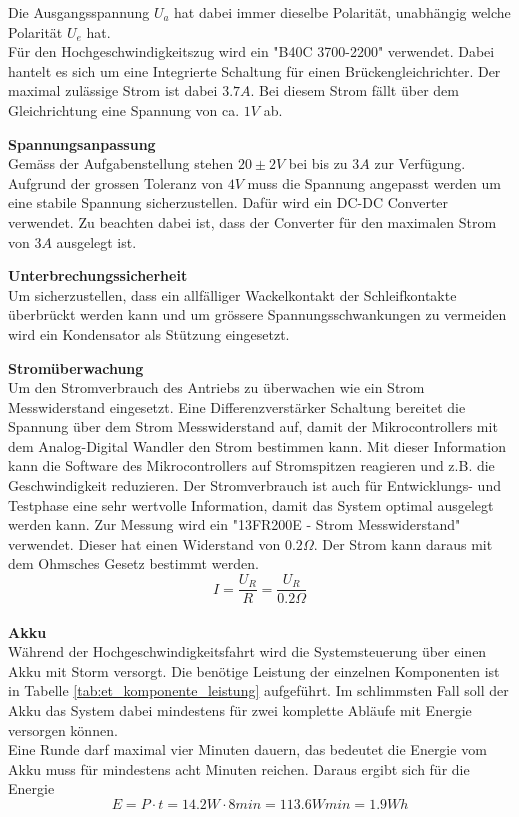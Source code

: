 \documentclass[../../main.tex]{subfiles}
\begin{document}
    Die Ausgangsspannung $U_a$ hat dabei immer dieselbe Polarität, unabhängig welche Polarität $U_e$ hat. \\
    Für den Hochgeschwindigkeitszug wird ein "B40C 3700-2200"  verwendet. Dabei hantelt es sich um eine Integrierte Schaltung für einen Brückengleichrichter. Der maximal zulässige Strom ist dabei $3.7A$. Bei diesem Strom fällt über dem Gleichrichtung eine Spannung von ca. $1V$ ab.

    \textbf{Spannungsanpassung}\\
    Gemäss der Aufgabenstellung stehen $20\pm2V$ bei bis zu $3A$ zur Verfügung. Aufgrund der grossen Toleranz von $4V$ muss die Spannung angepasst werden um eine stabile Spannung sicherzustellen. Dafür wird ein DC-DC Converter verwendet. Zu beachten dabei ist, dass der Converter für den maximalen Strom von $3A$ ausgelegt ist.

    \textbf{Unterbrechungssicherheit}\\
    Um sicherzustellen, dass ein allfälliger Wackelkontakt der Schleifkontakte überbrückt werden kann und um grössere Spannungsschwankungen zu vermeiden wird ein Kondensator als Stützung eingesetzt.

    \textbf{Stromüberwachung}\\
    Um den Stromverbrauch des Antriebs zu überwachen wie ein Strom Messwiderstand eingesetzt. Eine
    Differenzverstärker Schaltung bereitet die Spannung über dem Strom Messwiderstand auf, damit der Mikrocontrollers mit
    dem Analog-Digital Wandler den Strom bestimmen kann. Mit dieser Information kann die Software des Mikrocontrollers
    auf Stromspitzen reagieren und z.B. die Geschwindigkeit reduzieren. Der Stromverbrauch ist auch für Entwicklungs-
    und Testphase eine sehr wertvolle Information, damit das System optimal ausgelegt werden kann.
    Zur Messung wird ein "13FR200E - Strom Messwiderstand" verwendet. Dieser hat einen Widerstand von $0.2\Omega$. Der Strom kann daraus mit dem Ohmsches Gesetz bestimmt werden. $$I=\frac{U_R}{R}=\frac{U_R}{0.2\Omega} $$
    \\
    \textbf{Akku}\\
    Während der Hochgeschwindigkeitsfahrt wird die Systemsteuerung über einen Akku mit Storm versorgt. Die benötige Leistung der einzelnen Komponenten ist in Tabelle \ref{tab:et_komponente_leistung} aufgeführt. Im schlimmsten Fall soll der Akku das System dabei mindestens für zwei komplette Abläufe mit Energie versorgen können.\\
    Eine Runde darf maximal vier Minuten dauern, das bedeutet die Energie vom Akku muss für mindestens acht Minuten reichen. Daraus ergibt sich für die Energie $$E=P\cdot t = 14.2W \cdot 8min = 113.6Wmin = 1.9Wh$$
\end{document}

